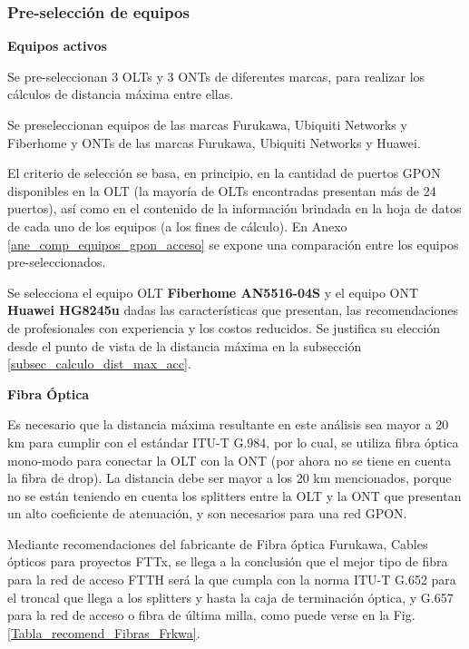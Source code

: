 \documentclass[12pt,a4paper]{book}
\begin{document}
\subsubsection{Pre-selección de equipos}\label{sub_preSelecEq_fibra_acc}
\large
\noindent \textbf{Equipos activos}

\normalsize
\medskip 

Se pre-seleccionan 3 OLTs y 3 ONTs
de diferentes marcas, para realizar los cálculos de distancia máxima entre
ellas.

\medskip 
Se preseleccionan equipos de las marcas Furukawa, Ubiquiti Networks y Fiberhome y ONTs de las marcas Furukawa, Ubiquiti Networks y Huawei.

\medskip

El criterio de selección se basa, en principio, en la cantidad de puertos
GPON disponibles en la OLT (la mayoría de OLTs encontradas presentan
más de 24 puertos), así como en el contenido de la información brindada en
la hoja de datos de cada uno de los equipos (a los fines de cálculo). En Anexo \ref{ane_comp_equipos_gpon_acceso} se expone una comparación entre los equipos pre-seleccionados.

\medskip 

Se selecciona el equipo OLT \textbf{Fiberhome AN5516-04S} y el equipo ONT \textbf{Huawei HG8245u} dadas las características que presentan, las recomendaciones de profesionales con experiencia y los costos reducidos. Se justifica su elección desde el punto de vista de la distancia máxima en la subsección \ref{subsec_calculo_dist_max_acc}.

\medskip 

\large
\noindent\textbf{Fibra Óptica}
\medskip 
\normalsize

Es necesario que la distancia máxima resultante en este análisis sea
mayor a 20 km para cumplir con el estándar ITU-T G.984, por lo cual, se
utiliza fibra óptica mono-modo para conectar la OLT con la ONT (por ahora
no se tiene en cuenta la fibra de drop). La distancia debe ser mayor a los 20
km mencionados, porque no se están teniendo en cuenta los splitters entre
la OLT y la ONT que presentan un alto coeficiente de atenuación, y son
necesarios para una red GPON.

 \medskip

Mediante recomendaciones del fabricante de Fibra óptica Furukawa, Cables
ópticos para proyectos FTTx, se llega a la conclusión que el mejor tipo de fibra para la red de acceso FTTH será la que cumpla con la norma ITU-T G.652 para el troncal que llega a los splitters y hasta la caja de terminación óptica, y G.657 para la red de acceso o fibra de última milla, como puede verse en la Fig. \ref{Tabla_recomend_Fibras_Frkwa}.
\end{document}
